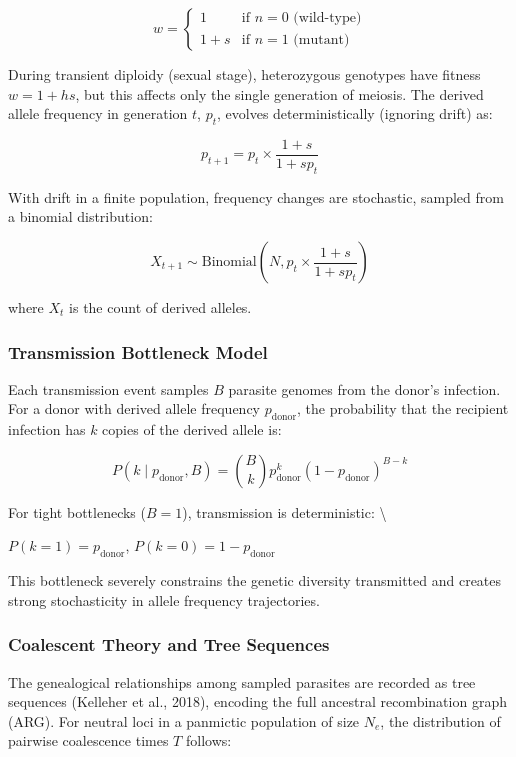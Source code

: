 \documentclass[
  11pt,
]{article}
\begin{document}
\[w = \begin{cases}
1 & \text{if } n = 0 \text{ (wild-type)} \\
1 + s & \text{if } n = 1 \text{ (mutant)}
\end{cases}\]

During transient diploidy (sexual stage), heterozygous genotypes have
fitness \(w = 1 + hs\), but this affects only the single generation of
meiosis. The derived allele frequency in generation \(t\), \(p_t\),
evolves deterministically (ignoring drift) as:

\[p_{t+1} = p_t \times \frac{1+s}{1 + s p_t}\]

With drift in a finite population, frequency changes are stochastic,
sampled from a binomial distribution:

\[X_{t+1} \sim \text{Binomial}\left(N, p_t \times \frac{1+s}{1 + s p_t}\right)\]

where \(X_t\) is the count of derived alleles.

\subsubsection{Transmission Bottleneck
Model}\label{transmission-bottleneck-model}

Each transmission event samples \(B\) parasite genomes from the donor's
infection. For a donor with derived allele frequency
\(p_{\text{donor}}\), the probability that the recipient infection has
\(k\) copies of the derived allele is:

\[P(k \mid p_{\text{donor}}, B) = \binom{B}{k} p_{\text{donor}}^k (1-p_{\text{donor}})^{B-k}\]

For tight bottlenecks (\(B=1\)), transmission is deterministic:
\textbackslash{}

\(P(k=1) = p_{\text{donor}}\), \(P(k=0) = 1-p_{\text{donor}}\)

This bottleneck severely constrains the genetic diversity transmitted
and creates strong stochasticity in allele frequency trajectories.

\subsubsection{Coalescent Theory and Tree
Sequences}\label{coalescent-theory-and-tree-sequences}

The genealogical relationships among sampled parasites are recorded as
tree sequences (Kelleher et al., 2018), encoding the full ancestral
recombination graph (ARG). For neutral loci in a panmictic population of
size \(N_e\), the distribution of pairwise coalescence times \(T\)
follows:
\end{document}
